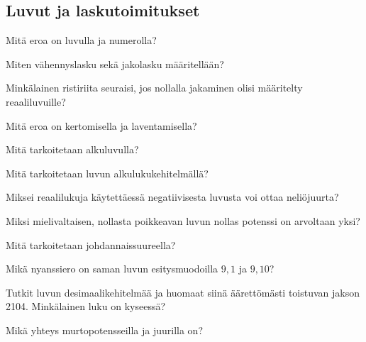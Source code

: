 \subsection*{Luvut ja laskutoimitukset}

\begin{tehtava}
Mitä eroa on luvulla ja numerolla?
\end{tehtava}

\begin{tehtava}
Miten vähennyslasku sekä jakolasku määritellään?
\end{tehtava}

\begin{tehtava}
Minkälainen ristiriita seuraisi, jos nollalla jakaminen olisi määritelty reaaliluvuille?
\end{tehtava}

\begin{tehtava}
Mitä eroa on kertomisella ja laventamisella?
\end{tehtava}

\begin{tehtava}
Mitä tarkoitetaan alkuluvulla?
\end{tehtava}

\begin{tehtava}
Mitä tarkoitetaan luvun alkulukukehitelmällä?
\end{tehtava}

\begin{tehtava}
Miksei reaalilukuja käytettäessä negatiivisesta luvusta voi ottaa neliöjuurta?
\end{tehtava}

\begin{tehtava}
Miksi mielivaltaisen, nollasta poikkeavan luvun nollas potenssi on arvoltaan yksi?
\end{tehtava}

\begin{tehtava}
Mitä tarkoitetaan johdannaissuureella?
\end{tehtava}

\begin{tehtava}
Mikä nyanssiero on saman luvun esitysmuodoilla $9,1$ ja $9,10$?
\end{tehtava}

\begin{tehtava}
Tutkit luvun desimaalikehitelmää ja huomaat siinä äärettömästi toistuvan jakson 2104. Minkälainen luku on kyseessä?
\end{tehtava}

\begin{tehtava}
Mikä yhteys murtopotensseilla ja juurilla on?
\end{tehtava}

